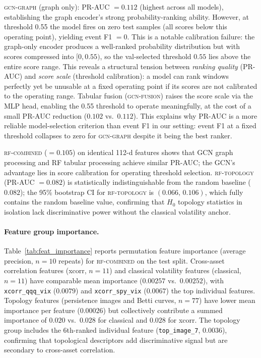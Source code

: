 \documentclass[sigconf]{acmart}
\begin{document}
\textsc{gcn-graph} (graph only): PR-AUC $= 0.112$ (highest across all models),
establishing the graph encoder's strong probability-ranking ability. However,
at threshold 0.55 the model fires on zero test samples (all scores below this
operating point), yielding event F1 $= 0$.
This is a notable calibration failure: the graph-only encoder produces a
well-ranked probability distribution but with scores compressed into $[0, 0.55)$,
so the val-selected threshold $0.55$ lies above the entire score range.
This reveals a structural tension between \emph{ranking quality} (PR-AUC) and
\emph{score scale} (threshold calibration): a model can rank windows perfectly
yet be unusable at a fixed operating point if its scores are not calibrated to
the operating range. Tabular fusion (\textsc{gcn-fusion}) raises the score scale
via the MLP head, enabling the 0.55 threshold to operate meaningfully, at the
cost of a small PR-AUC reduction ($0.102$ vs.\ $0.112$).
This explains why PR-AUC is a more reliable model-selection criterion than
event F1 in our setting: event F1 at a fixed threshold collapses to zero for
\textsc{gcn-graph} despite it being the best ranker.

\textsc{rf-combined} ($= 0.105$) on identical 112-d features shows that GCN
graph processing and RF tabular processing achieve similar PR-AUC; the GCN's
advantage lies in score calibration for operating threshold selection.
\textsc{rf-topology} (PR-AUC $= 0.082$) is statistically indistinguishable from
the random baseline ($0.082$); the 95\% bootstrap CI for \textsc{rf-topology}
is $(0.066,\, 0.106)$, which fully contains the random baseline value, confirming
that $H_0$ topology statistics in isolation lack discriminative power without the
classical volatility anchor.

\paragraph{Feature group importance.}
Table~\ref{tab:feat_importance} reports permutation feature importance
(average precision, $n{=}10$ repeats) for \textsc{rf-combined} on the test split.
Cross-asset correlation features (xcorr, $n{=}11$) and classical volatility
features (classical, $n{=}11$) have comparable mean importance
($0.00257$ vs.\ $0.00252$), with \texttt{xcorr\_qqq\_vix} ($0.0079$) and
\texttt{xcorr\_spy\_vix} ($0.0067$) the top individual features.
Topology features (persistence images and Betti curves, $n{=}77$) have lower
mean importance per feature ($0.00026$) but collectively contribute
a summed importance of $0.020$ vs.\ $0.028$ for classical and $0.028$ for xcorr.
The topology group includes the 6th-ranked individual feature (\texttt{top\_image\_7},
$0.0036$), confirming that topological descriptors add discriminative signal
but are secondary to cross-asset correlation.
\end{document}
